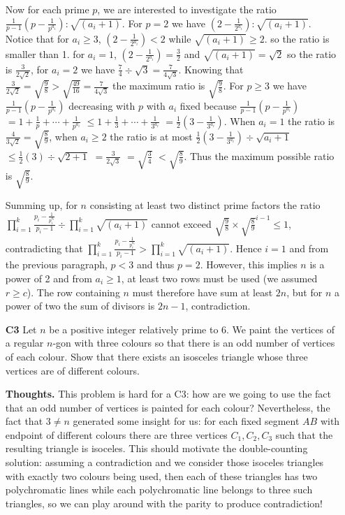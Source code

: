 \documentclass[11pt,a4paper]{article}
\begin{document}
\begin{itemize}
Now for each prime $p$, we are interested to investigate the ratio
$\frac{1}{p-1}(p-\frac{1}{p^{a_i}}): \sqrt{(a_i+1)}$. 
For $p=2$ we have $(2-\frac{1}{2^{a_i}}): \sqrt{(a_i+1)}$. 
Notice that for $a_i\ge 3$, $(2-\frac{1}{2^{a_i}})<2$ while $\sqrt{(a_i+1)}\ge 2$. 
so the ratio is smaller than 1. 
for $a_i=1$, $(2-\frac{1}{2^{a_i}})=\frac 32$ and $\sqrt{(a_i+1)}=\sqrt{2}$ so the ratio is $\frac 3{2\sqrt{2}}$, 
for $a_i=2$ we have $\frac 74\div \sqrt{3}=\frac 7{4\sqrt{3}}$. 
Knowing that $\frac 3{2\sqrt{2}}=\sqrt{\frac 98}>\sqrt{\frac {49}{16}}=\frac 7{4\sqrt{3}}$ the maximum ratio is 
$\sqrt{\frac 98}$. 
For $p\ge 3$ we have $\frac{1}{p-1}(p-\frac{1}{p^{a_i}})$ decreasing with $p$ with $a_i$ fixed because
$\frac{1}{p-1}(p-\frac{1}{p^{a_i}})$
$=1+\frac 1p+\cdots +\frac 1{p^{a_i}}$
$\le 1+\frac 13+\cdots +\frac 1{3^{a_i}}$
$=\frac{1}{2}(3-\frac{1}{3^{a_i}})$. 
When $a_i=1$ the ratio is $\frac 4{3\sqrt{2}}=\sqrt{\frac 89}$, when $a_i\ge 2$ the ratio is at most 
$\frac{1}{2}(3-\frac{1}{3^{a_i}})\div \sqrt{a_i+1}$
$\le\frac{1}{2}(3)\div \sqrt{2+1}$
$=\frac 3{2\sqrt{3}}$
$=\sqrt{\frac 34}$
$<\sqrt{\frac 89}$. 
Thus the maximum possible ratio is $ \sqrt{\frac 89}$. 

Summing up, for $n$ consisting at least two distinct prime factors the ratio 
$\displaystyle\prod_{i=1}^k \frac{p_i-\frac{1}{p_i^{a_i}}}{p_i-1}\div\displaystyle\prod_{i=1}^k \sqrt{(a_i+1)}$
cannot exceed 
$\sqrt{\frac 98}\times \sqrt{\frac 89}^{i-1}\le 1$, 
contradicting that $\displaystyle\prod_{i=1}^k \frac{p_i-\frac{1}{p_i^{a_i}}}{p_i-1}>\displaystyle\prod_{i=1}^k \sqrt{(a_i+1)}$. 
Hence $i=1$ and from the previous paragraph, $p < 3$ and thus $p=2$. 
However, this implies $n$ is a power of 2 and from $a_i\ge 1$, at least two rows must be used (we assumed $r\ge c$). 
The row containing $n$ must therefore have sum at least $2n$, 
but for $n$ a power of two the sum of divisors is $2n-1$, contradiction. 

\item[\textbf{C3}]
Let $n$ be a positive integer relatively prime to $6$. We paint the vertices of a regular $n$-gon with three colours so that there is an odd number of vertices of each colour. Show that there exists an isosceles triangle whose three vertices are of different colours.

\textbf{Thoughts.} 
This problem is hard for a C3: how are we going to use the fact that an odd number of vertices is painted for each colour? 
Nevertheless, the fact that $3\neq n$ generated some insight for us: for each fixed segment $AB$ with endpoint of different colours there are three vertices $C_1, C_2, C_3$ such that the resulting triangle is isoceles. 
This should motivate the double-counting solution: assuming a contradiction and we consider those isoceles triangles with exactly two colours being used, then each of these triangles has two polychromatic lines while each polychromatic line belongs to three such triangles, so we can play around with the parity to produce contradiction!


\end{itemize}
\end{document}
